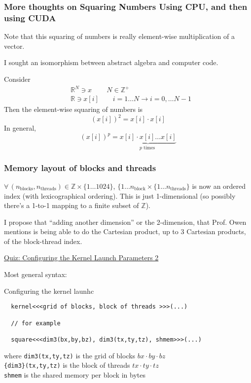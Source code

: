 \documentclass[10pt]{amsart}
\begin{document}
\begin{multicols*}{2}
\subsubsection{More thoughts on Squaring Numbers Using CPU, and then using CUDA}

Note that this squaring of numbers is really element-wise multiplication of a vector.

I sought an isomorphism between abstract algebra and computer code.

Consider
\[
\begin{aligned}
 &  \mathbb{R}^N \ni x \qquad \, N \in \mathbb{Z}^+ \\ 
 &  \mathbb{R} \ni x[i] \qquad i = 1 \dots N \to i = 0, \dots N-1 
  \end{aligned}
\]
Then the element-wise squaring of numbers is
\[
(x[i])^2 = x[i] \cdot x[i]
\]
In general,
\[
(x[i])^p = \underbrace{x[i]\cdot x[i] \dots x[i]}_{ p \text{ times } }
\]

\subsubsection{Memory layout of blocks and threads}

$\forall \, (n_{\text{blocks}}, n_{\text{threads}}) \in \mathbb{Z} \times \lbrace 1 \dots 1024 \rbrace$, $\lbrace 1 \dots n_{\text{block}} \times \lbrace 1 \dots n_{\text{threads}} \rbrace$ is now an ordered index (with lexicographical ordering).  This is just 1-dimensional (so possibly there's a 1-to-1 mapping to a finite subset of $\mathbb{Z}$).

I propose that ``adding another dimension'' or the 2-dimension, that Prof. Owen mentions is being able to do the Cartesian product, up to 3 Cartesian products, of the block-thread index.  

\href{https://classroom.udacity.com/courses/cs344/lessons/55120467/concepts/668398860923}{Quiz: Configuring the Kernel Launch Parameters 2 }

Most general syntax:

Configuring the kernel launhc
\begin{lstlisting}
  kernel<<<grid of blocks, block of threads >>>(...)

  // for example

  square<<<dim3(bx,by,bz), dim3(tx,ty,tz), shmem>>>(...)
  \end{lstlisting}
where \verb|dim3(tx,ty,tz)| is the grid of blocks $bx\cdot by \cdot bz$ \\
\phantom{ where } \verb|{dim3}(tx,ty,tz)| is the block of threads $tx \cdot ty \cdot tz$ \\
\phantom{ where } \verb|shmem| is the shared memory per block in bytes



\end{multicols*}
\end{document}
